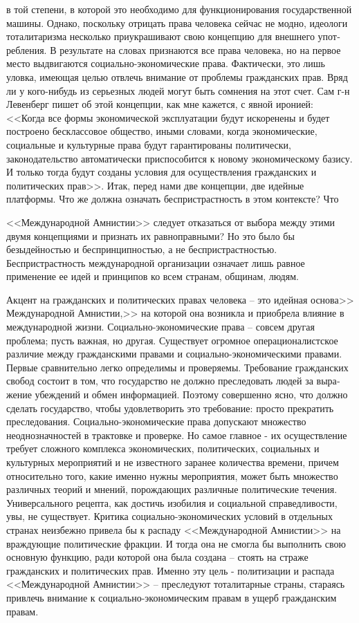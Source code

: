 \documentclass{book}
\begin{document}
в той степени, в которой это необходимо для функционирова­ния государственной машины. Однако, поскольку отрицать права человека сейчас не модно, идеологи тоталитаризма не­сколько приукрашивают свою концепцию для внешнего упот­ребления. В результате на словах признаются все права челове­ка, но на первое место выдвигаются социально-экономиче­ские права. Фактически, это лишь уловка, имеющая целью от­влечь внимание от проблемы гражданских прав. Вряд ли у ко­го-нибудь из серьезных людей могут быть сомнения на этот счет. Сам г-н Левенберг пишет об этой концепции, как мне ка­жется, с явной иронией: <<Когда все формы экономической эксплуатации будут искоренены и будет построено бесклассо­вое общество, иными словами, когда экономические, социаль­ные и культурные права будут гарантированы политически, законодательство автоматически приспособится к новому экономическому базису. И только тогда будут созданы условия для осуществления гражданских и политических прав>>.
Итак, перед нами две концепции, две идейные платформы. Что же должна означать беспристрастность в этом контексте? Что 

<<Международной Амнистии>> следует отказаться от выбора между этими двумя концепциями и признать их равноправны­ми? Но это было бы безыдейностью и беспринципностью, а не беспристрастностью. Беспристрастность международной органи­зации означает лишь равное применение ее идей и принципов ко всем странам, общинам, людям.

Акцент на гражданских и политических правах человека -- это идейная основа>> Международной Амнистии,>> на которой она возникла и 
приобрела влияние в международной жизни. Социально-экономические права -- совсем другая проблема; пусть важная, но другая. 
Существует огромное операционалистское различие между гражданскими правами и социально-экономическими правами. Первые 
сравнительно легко опреде­лимы и проверяемы. Требование гражданских свобод состоит в том, что государство не должно преследовать 
людей за выра­жение убеждений и обмен информацией. Поэтому совершенно ясно, что должно сделать государство, чтобы удовлетворить 
это требование: просто прекратить преследования. Социально-экономические права допускают множество  неоднозначно­стей в трактовке 
и проверке. Но самое главное - их осуще­ствление требует сложного комплекса экономических, полити­ческих, социальных и культурных 
мероприятий и не известно­го заранее количества времени, причем относительно того, ка­кие именно нужны мероприятия, может быть 
множество раз­личных теорий и мнений, порождающих различные полити­ческие течения. Универсального рецепта, как достичь изобилия и 
социальной справедливости, увы, не существует. Критика социально-экономических условий в отдельных странах неиз­бежно привела бы 
к распаду <<Международной Амнистии>> на враждующие политические фракции. И тогда она не смогла бы выполнить свою основную функцию, 
ради которой она была создана -- стоять на страже гражданских и политических прав. Именно эту цель - политизации и распада 
<<Международной Ам­нистии>> -- преследуют тоталитарные страны, стараясь привлечь внимание к социально-экономическим правам в ущерб граж­данским правам.
\end{document}
